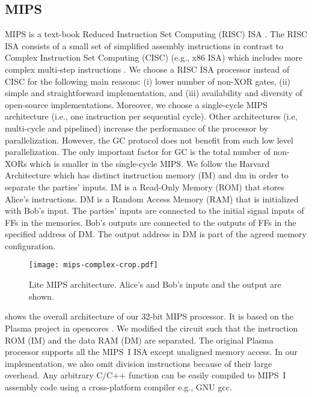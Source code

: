 \subsection{MIPS}\label{ssec:processor-mips}
MIPS is a text-book Reduced Instruction Set Computing (RISC) ISA \cite{kane1992mips}.
The RISC ISA consists of a small set of simplified assembly instructions in contrast to Complex Instruction Set Computing (CISC) (e.g., x86 ISA) which includes more complex multi-step instructions \cite{hennessy2012computer}.
We choose a RISC ISA processor instead of CISC for the following main reasons: (i) lower number of non-XOR gates, (ii) simple and straightforward implementation, and (iii) availability and diversity of open-source implementations.
Moreover, we choose a single-cycle MIPS architecture (i.e., one instruction per sequential cycle).
Other architectures (i.e, multi-cycle and pipelined) increase the performance of the processor by parallelization.
However, the GC protocol does not benefit from such low level parallelization.
The only important factor for GC is the total number of non-XORs which is smaller in the single-cycle MIPS.
We follow the Harvard Architecture which has distinct instruction memory (IM) and \acrfull{dm} in order to separate the parties' inputs.
IM is a Read-Only Memory (ROM) that stores Alice's instructions.
DM is a Random Access Memory (RAM) that is initialized with Bob's input.
The parties' inputs are connected to the initial signal inputs of FFs in the memories.
Bob's outputs are connected to the outputs of FFs in the specified address of DM.
The output address in DM is part of the agreed memory configuration.

\begin{figure}[ht]
\centering
\texttt{[image: mips-complex-crop.pdf]}
\caption{Lite MIPS architecture.
  Alice's and Bob's inputs and the output are shown.}\label{figure:mips}
\end{figure}

 shows the overall architecture of our 32-bit MIPS processor.
It is based on the Plasma project in opencores \cite{rhoads2006plasma}.
We modified the circuit such that the instruction ROM (IM) and the data RAM (DM) are separated.
The original Plasma processor supports all the MIPS~I ISA except unaligned memory access.
In our implementation, we also omit division instructions because of their large overhead.
Any arbitrary C/C++ function can be easily compiled to MIPS~I assembly code using a cross-platform compiler e.g., GNU gcc.

